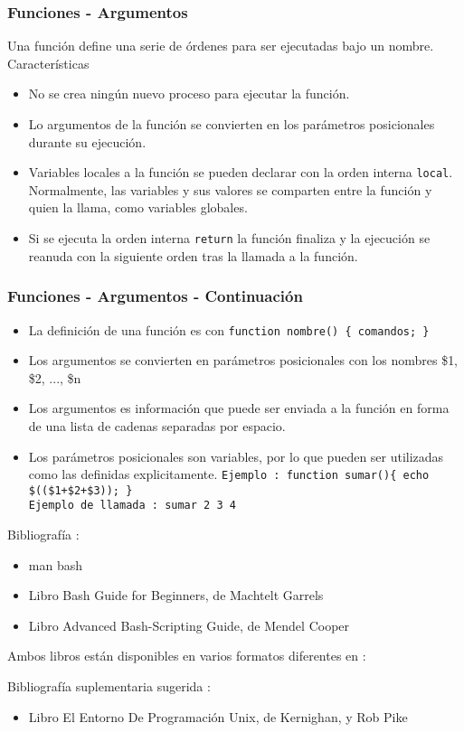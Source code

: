 \documentclass{beamer}
\begin{document}
\begin{frame}
\frametitle{Funciones - Argumentos}
       Una  función define una serie de órdenes para ser ejecutadas bajo un nombre. Características

\begin{itemize}
\item No  se crea ningún nuevo proceso para ejecutar la función.
\item Lo argumentos de  la  función  se
       convierten  en los parámetros posicionales durante su ejecución.
\item 
       Variables locales a la función se pueden declarar con la orden interna \texttt{local}.
Normalmente, las
       variables y sus valores se comparten entre la función y quien la llama, como variables globales.

\item
       Si se ejecuta la orden interna \texttt{return} la función finaliza y la ejecución se reanuda con
       la  siguiente  orden tras la llamada a la función. 

\end{itemize}
\end{frame}

\begin{frame}
\frametitle{Funciones - Argumentos - Continuación}
\begin{itemize}
\item La definición de una función es con \texttt{function nombre() \{ comandos; \} }
\item Los argumentos se convierten en parámetros posicionales con los nombres \$1, \$2, ..., \$n
\item Los argumentos es información que puede ser enviada a la función en forma de una lista de cadenas separadas por espacio.\\ 
\item Los parámetros posicionales son variables, por lo que pueden ser utilizadas como las definidas explicitamente.
\texttt{Ejemplo : function sumar()\{ echo \$((\$1+\$2+\$3)); \} }\\ 
\texttt{Ejemplo de llamada : sumar 2 3 4 }
\end{itemize}
\end{frame}






\begin{frame}
Bibliografía : 
\begin{itemize}
\item man bash
\item Libro Bash Guide for Beginners, de Machtelt Garrels 
\item Libro Advanced Bash-Scripting Guide, de Mendel Cooper
\end{itemize}

Ambos libros están disponibles en varios formatos diferentes en :

Bibliografía suplementaria sugerida : 
\begin{itemize}
\item Libro El Entorno De Programación Unix, de Kernighan, y Rob Pike
\end{itemize}

\end{frame}
\end{document}
